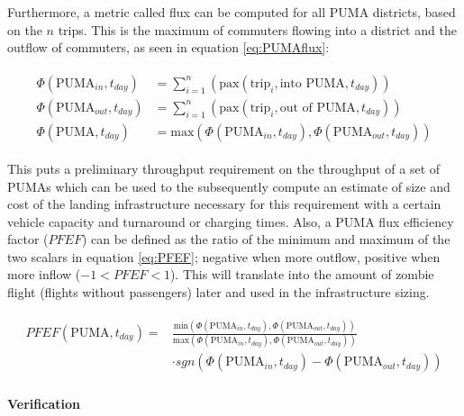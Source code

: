  Furthermore, a metric called flux can be computed for all PUMA districts, based on the $n$ trips. This is the maximum of commuters flowing into a district and the outflow of commuters, as seen in equation \ref{eq:PUMAflux}:

\begin{align} \label{eq:PUMAflux}
    \begin{split}
    \Phi(\text{PUMA}_{in}, t_{day}) &= \sum_{i=1}^n{ \left( \text{pax}(\text{trip}_i, \text{into   PUMA}, t_{day})\right)}\\
    \Phi(\text{PUMA}_{out}, t_{day}) &= \sum_{i=1}^n{ \left( \text{pax}(\text{trip}_i, \text{out of PUMA}, t_{day})\right)}\\
    \Phi(\text{PUMA}, t_{day}) &= \text{max} 
    \left(
        \Phi(\text{PUMA}_{in}, t_{day}),
        \Phi(\text{PUMA}_{out}, t_{day})
    \right)
    \end{split}
\end{align}

This puts a preliminary throughput requirement on the throughput of a set of PUMAs which can be used to the subsequently compute an estimate of size and cost of the landing infrastructure necessary for this requirement with a certain vehicle capacity and turnaround or charging times. Also, a PUMA flux efficiency factor ($PFEF$) can be defined as the ratio of the minimum and maximum of the two scalars in equation \ref{eq:PFEF}; negative when more outflow, positive when more inflow ($-1 < PFEF < 1$). This will translate into the amount of zombie flight (flights without passengers) later and used in the infrastructure sizing.

\begin{align} \label{eq:PFEF}
    \begin{split}
        PFEF(\text{PUMA}, t_{day}) = &\frac{\text{min} 
        \left(
            \Phi(\text{PUMA}_{in}, t_{day}),
            \Phi(\text{PUMA}_{out}, t_{day})
        \right)
        }{\text{max} 
        \left(
            \Phi(\text{PUMA}_{in}, t_{day}),
            \Phi(\text{PUMA}_{out}, t_{day})
        \right)
        } \\
        &\cdot sgn ( \Phi(\text{PUMA}_{in}, t_{day}) - \Phi(\text{PUMA}_{out}, t_{day}) )
    \end{split}
\end{align}



\paragraph{Verification}

